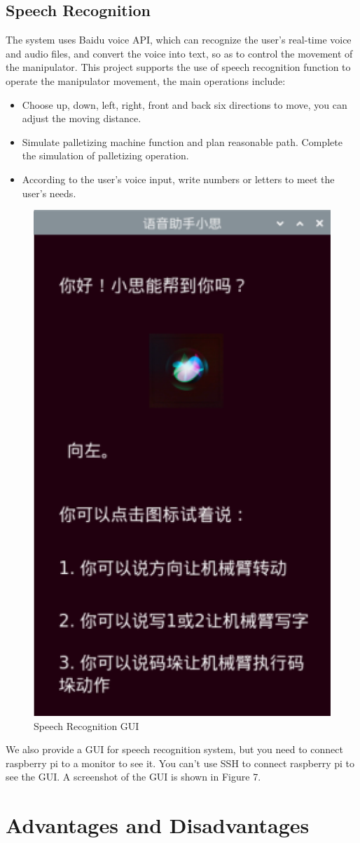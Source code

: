 \documentclass{hci}
\begin{document}
\subsection{Speech Recognition}
The system uses Baidu voice API, which can recognize the user's real-time voice and audio files, and convert the voice into text, so as to control the movement of the manipulator.
This project supports the use of speech recognition function to operate the manipulator movement, the main operations include:
\begin{itemize}
	\item Choose up, down, left, right, front and back six directions to move, you can adjust the moving distance.
	\item Simulate palletizing machine function and plan reasonable path. Complete the simulation of palletizing operation.
	\item According to the user's voice input, write numbers or letters to meet the user's needs.
\end{itemize}
\begin{figure}[htbp]
	\centering
	\includegraphics[width=0.5\linewidth]{figures/S}
	\caption{Speech Recognition GUI}
	\label{fig:S}
\end{figure}
We also provide a GUI for speech recognition system, but you need to connect raspberry pi to a monitor to see it. You can't use SSH to connect raspberry pi to see the GUI. A screenshot of the GUI is shown in Figure 7.
\section{Advantages and Disadvantages}
\end{document}
